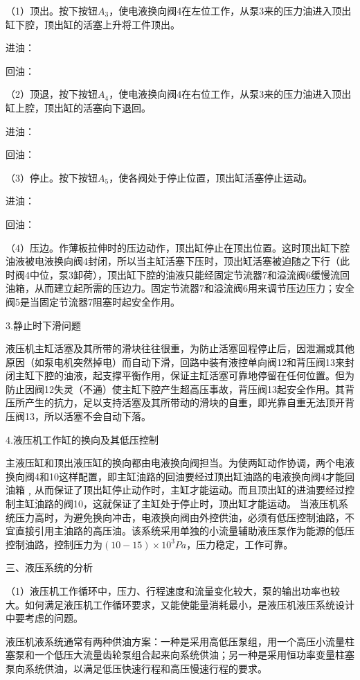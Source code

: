 （1）顶出。按下按钮$A_3$，使电液换向阀4在左位工作，从泵3来的压力油进入顶出缸下腔，顶出缸的活塞上升将工件顶出。

进油：

回油：

（2）顶退，按下按钮$A_4$，使电液换向阀4在右位工作，从泵3来的压力油进入顶出缸上腔，顶出缸的活塞向下退回。

进油：

回油：

（3）停止。按下按钮$A_5$，使各阀处于停止位置，顶出缸活塞停止运动。

进油：

回油：

（4）压边。作薄板拉伸时的压边动作，顶出缸停止在顶出位置。这时顶出缸下腔油液被电液换向阀4封闭，所以当主缸活塞下压时，顶出缸活塞被迫随之下行（此时阀4中位，泵3卸荷），顶出缸下腔的油液只能经固定节流器7和溢流阀6缓慢流回油箱，从而建立起所需的压边力。固定节流器7和溢流阀6用来调节压边压力；安全阀5是当固定节流器7阻塞时起安全作用。

3.静止时下滑问题

液压机主缸活塞及其所带的滑块往往很重，为防止活塞回程停止后，因泄漏或其他原因（如泵电机突然掉电）而自动下滑，回路中装有液控单向阀12和背压阀13来封闭主缸下腔的油液，起支撑平衡作用，保证主缸活塞可靠地停留在任何位置。但为防止因阀12失灵（不通）使主缸下腔产生超高压事故，背压阀13起安全作用。其背压所产生的抗力，足以支持活塞及其所带动的滑块的自重，即光靠自重无法顶开背压阀13，所以活塞不会自动下落。

4.液压机工作缸的换向及其低压控制

主液压缸和顶出液压缸的换向都由电液换向阀担当。为使两缸动作协调，两个电液换向阀4和10这样配置，即主缸油路的回油要经过顶出缸油路的电液换向阀4才能回油箱﹐从而保证了顶出缸停止动作时，主缸才能运动。而且顶出缸的进油要经过控制主缸油路的阀10，这就保证了主缸处于停止时，顶出缸才能运动。
当液压机系统压力高时，为避免换向冲击，电液换向阀由外控供油，必须有低压控制油路，不宜直接引用主油路的高压油。该系统采用单独的小流量辅助液压泵作为能源的低压控制油路，控制压力为$(10-15)×10^3Pa$，压力稳定，工作可靠。

三、液压系统的分析

（1）液压机工作循环中，压力、行程速度和流量变化较大，泵的输出功率也较大。如何满足液压机工作循环要求，又能使能量消耗最小，是液压机液压系统设计中要考虑的问题。

液压机液系统通常有两种供油方案：一种是采用高低压泵组，用一个高压小流量柱塞泵和一个低压大流量齿轮泵组合起来向系统供油；另一种是采用恒功率变量柱塞泵向系统供油，以满足低压快速行程和高压慢速行程的要求。

